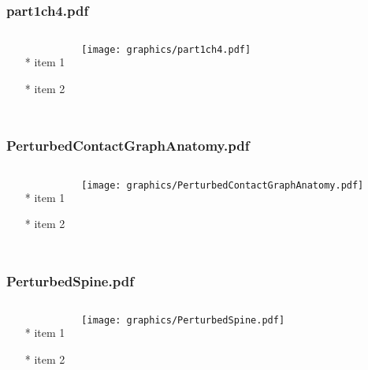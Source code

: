 \documentclass{beamer}
\begin{document}
\begin{frame} \frametitle{part1ch4.pdf}
    \begin{columns}[c]
        \begin{itemize}
            \item[*] item 1
            \item[*] item 2
        \end{itemize}
        \begin{minipage}{\linewidth}
            \begin{center}
            \texttt{[image: graphics/part1ch4.pdf]}
            \label{gfx:part1ch4.pdf}
            \end{center}
        \end{minipage}
    \end{columns}
\end{frame}
\begin{frame} \frametitle{PerturbedContactGraphAnatomy.pdf}
    \begin{columns}[c]
        \begin{itemize}
            \item[*] item 1
            \item[*] item 2
        \end{itemize}
        \begin{minipage}{\linewidth}
            \begin{center}
            \texttt{[image: graphics/PerturbedContactGraphAnatomy.pdf]}
            \label{gfx:PerturbedContactGraphAnatomy.pdf}
            \end{center}
        \end{minipage}
    \end{columns}
\end{frame}
\begin{frame} \frametitle{PerturbedSpine.pdf}
    \begin{columns}[c]
        \begin{itemize}
            \item[*] item 1
            \item[*] item 2
        \end{itemize}
        \begin{minipage}{\linewidth}
            \begin{center}
            \texttt{[image: graphics/PerturbedSpine.pdf]}
            \label{gfx:PerturbedSpine.pdf}
            \end{center}
        \end{minipage}
    \end{columns}
\end{frame}
\end{document}
